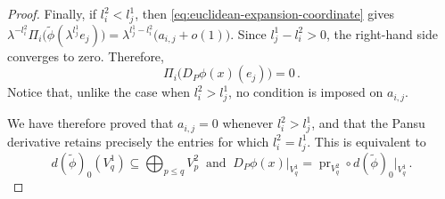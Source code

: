 \documentclass[10pt,a4paper]{amsart}
\begin{document}
\begin{proof}
Finally, if \(l_i^2<l_j^1\), then
\eqref{eq:euclidean-expansion-coordinate} gives $\lambda^{-l_i^2}
\Pi_i\bigl(\widetilde\phi(\lambda^{l_j^1}e_j)\bigr)
=
\lambda^{l_j^1-l_i^2}\bigl(a_{i,j}+o(1)\bigr)$.
Since \(l_j^1-l_i^2>0\), the right-hand side converges to zero.
Therefore,
\[
\Pi_i\bigl(D_P\phi(x)(e_j)\bigr)=0\,.
\]
Notice that, unlike the case when $l_i^2>l_j^1$, no condition is imposed on \(a_{i,j}\).

We have therefore proved that $a_{i,j}=0$ whenever $l_i^2>l_j^1$, and that the Pansu derivative retains precisely the entries for which $l_i^2=l_j^1$. This is equivalent to
\[
d(\widetilde\phi)_0(V_q^1)
\subseteq
\bigoplus_{p\leq q}V_p^2
\ \text{ and }\ 
D_P\phi(x)\big|_{V_q^1}
=
\operatorname{pr}_{V_q^2}
\circ d(\widetilde\phi)_0\big|_{V_q^1}\,.
\]
\end{proof}
\end{document}

